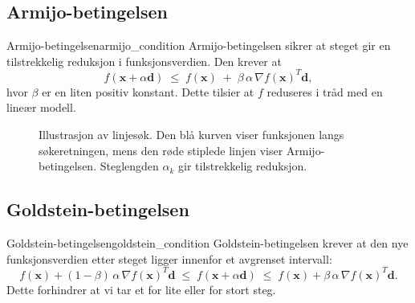 \subsection{Armijo-betingelsen}
\begin{definition}{Armijo-betingelsen}{armijo_condition}
  Armijo-betingelsen sikrer at steget gir en tilstrekkelig reduksjon i funksjonsverdien. Den krever at
  \[
    f(\symbf{x} + \alpha \symbf{d})
    \;\le\;
    f(\symbf{x})
    \;+\;
    \beta\,\alpha\,\nabla f(\symbf{x})^T \symbf{d},
  \]
  hvor \(\beta\) er en liten positiv konstant. Dette tilsier at \(f\) reduseres i tråd med en lineær modell.
\end{definition}

\begin{figure}[h]
  \centering
  \caption{Illustrasjon av linjesøk. Den blå kurven viser funksjonen langs søkeretningen, mens den røde stiplede linjen viser Armijo-betingelsen. Steglengden $\alpha_k$ gir tilstrekkelig reduksjon.}
\end{figure}

\subsection{Goldstein-betingelsen}
\begin{definition}{Goldstein-betingelsen}{goldstein_condition}
  Goldstein-betingelsen krever at den nye funksjonsverdien etter steget ligger innenfor et avgrenset intervall:
  \[
    f(\symbf{x}) + (1-\beta)\,\alpha\,\nabla f(\symbf{x})^T \symbf{d}
    \;\le\;
    f(\symbf{x} + \alpha \symbf{d})
    \;\le\;
    f(\symbf{x}) + \beta\,\alpha\,\nabla f(\symbf{x})^T \symbf{d}.
  \]
  Dette forhindrer at vi tar et for lite eller for stort steg.
\end{definition}

